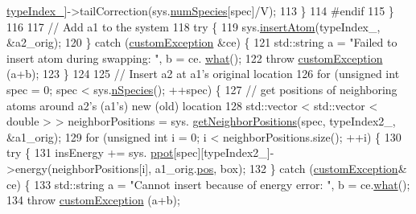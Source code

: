 \begin{DoxyCode}
      \hyperlink{classmc_move_acb731965547b0326ef318ec96da8b46a}{typeIndex\_}]->tailCorrection(sys.\hyperlink{classsim_system_a9eea865e6dc1cff377b1e79c4d9c23f0}{numSpecies}[spec]/V);
113                                 \}
114 \textcolor{preprocessor}{#endif}
115     \}
116     
117     \textcolor{comment}{// Add a1 to the system}
118     \textcolor{keywordflow}{try} \{
119                 sys.\hyperlink{classsim_system_a6c1e86f585f3a52aa82b6394ffbf1c6a}{insertAtom}(typeIndex\_, &a2\_orig);
120     \} \textcolor{keywordflow}{catch} (\hyperlink{classcustom_exception}{customException} &ce) \{
121                 std::string a = \textcolor{stringliteral}{"Failed to insert atom during swapping: "}, b = ce.
      \hyperlink{classcustom_exception_aeb6ab5848b038adfc68fde86a512f691}{what}();
122                 \textcolor{keywordflow}{throw} \hyperlink{classcustom_exception}{customException} (a+b);
123     \}
124 
125                 \textcolor{comment}{// Insert a2 at a1's original location}
126     \textcolor{keywordflow}{for} (\textcolor{keywordtype}{unsigned} \textcolor{keywordtype}{int} spec = 0; spec < sys.\hyperlink{classsim_system_ab5e2e9b6204de15520302fe1d51688dd}{nSpecies}(); ++spec) \{
127                 \textcolor{comment}{// get positions of neighboring atoms around a2's (a1's) new (old) location}
128                 std::vector < std::vector < double > > neighborPositions = sys.
      \hyperlink{classsim_system_a7ac49b2311cd8230df8d078a9d897b35}{getNeighborPositions}(spec, typeIndex2\_, &a1\_orig);
129         \textcolor{keywordflow}{for} (\textcolor{keywordtype}{unsigned} \textcolor{keywordtype}{int} i = 0; i < neighborPositions.size(); ++i) \{
130                                                 \textcolor{keywordflow}{try} \{
131                                                                 insEnergy += sys.
      \hyperlink{classsim_system_a8d6271751a62f61edcf57f773540a4a3}{ppot}[spec][typeIndex2\_]->energy(neighborPositions[i], a1\_orig.\hyperlink{classatom_a3ae5f4880e7831d8b2c9fda72b4eb24a}{pos}, box); 
132                                                 \} \textcolor{keywordflow}{catch} (\hyperlink{classcustom_exception}{customException}& ce) \{
133                                                                 std::string a = \textcolor{stringliteral}{"Cannot insert because of
       energy error: "}, b = ce.\hyperlink{classcustom_exception_aeb6ab5848b038adfc68fde86a512f691}{what}();
134                                                                 \textcolor{keywordflow}{throw} 
      \hyperlink{classcustom_exception}{customException} (a+b);

\end{DoxyCode}
